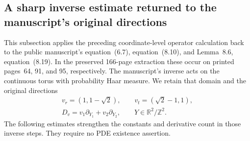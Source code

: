 \subsection{A sharp inverse estimate returned to the manuscript's original directions}
\label{sec:ns-reverse-smooth}

This subsection applies the preceding coordinate-level operator calculation
back to the public manuscript's equation~(6.7), equation~(8.10), and
Lemma~8.6, equation~(8.19). In the preserved 166-page extraction these
occur on printed pages~64, 91, and 95, respectively. The manuscript's
inverse acts on the continuous torus with probability Haar measure.
We retain that domain and the original directions
\[
 \begin{gathered}
 v_r=(1,1-\sqrt2),\qquad v_t=(\sqrt2-1,1),\\
 D_v=v_1\partial_{Y_1}+v_2\partial_{Y_2},\qquad
 Y\in\mathbb R^2/\mathbb Z^2.
 \end{gathered}
\]
The following estimates strengthen the constants and derivative count
in those inverse steps. They require no PDE existence assertion.

